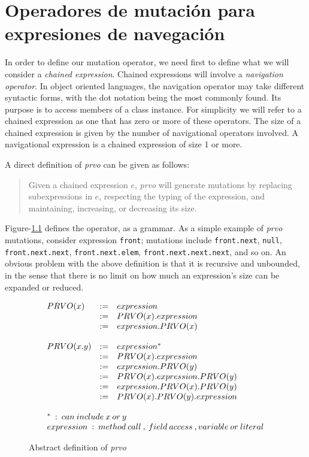 \chapter[PRVO]{Operadores de mutaci\'on para expresiones de navegaci\'on}
\label{sec:prvo}

In order to define our mutation operator, we need first to define what we will consider a \emph{chained expression}. Chained expressions will involve a \emph{navigation operator}. In object oriented languages, the navigation operator may take different syntactic forms, with the dot notation being the most commonly found. Its purpose is to access members of a class instance. For simplicity we will refer to a chained expression as one that has zero or more of these operators. The size of a chained expression is given by the number of navigational operators involved. A navigational expression is a chained expression of size 1 or more. 

A direct definition of \emph{prvo} can be given as follows:
\begin{quote}
	Given a chained expression $e$, \emph{prvo} will generate mutations by replacing subexpressions in $e$, respecting the typing of the expression, and maintaining, increasing, or decreasing its size. 
\end{quote}
Figure-\ref{definitions.prvo.simple_def} defines the operator, as a grammar. As a simple example of \emph{prvo} mutations, consider expression \texttt{front}; mutations include \texttt{front.next}, \texttt{null}, \texttt{front.next.next}, \texttt{front.next.elem}, \texttt{front.next.next.next}, and so on. An obvious problem with the above definition is that it is recursive and unbounded, in the sense that there is no limit on how much an expression's size can be expanded or reduced. 

\begin{figure}
	\begin{displaymath}
	\begin{array}{lll}
	PRVO(x)		& :=	& expression \\
	& := & PRVO(x).expression \\
	& := & expression.PRVO(x) \\
	\\
	PRVO(x.y)	& :=	& expression^{*} \\
	& :=	& PRVO(x).expression \\
	& :=	& expression.PRVO(y) \\
	& :=	& PRVO(x).expression.PRVO(y) \\
	& :=	& expression.PRVO(x).PRVO(y) \\
	& :=	& PRVO(x).PRVO(y).expression \\
	\\
	
	\multicolumn{3}{l}{\tiny{^{*} \: : \: can \: include \: x \: or \: y}} \\
	\multicolumn{3}{l}{\tiny{expression \: : \: method \: call \: , \: field \: access \: , variable \: or \: literal}}
	\end{array}
	\end{displaymath}
	\caption{Abstract definition of \emph{prvo}}
	\label{definitions.prvo.simple_def}
\end{figure}

